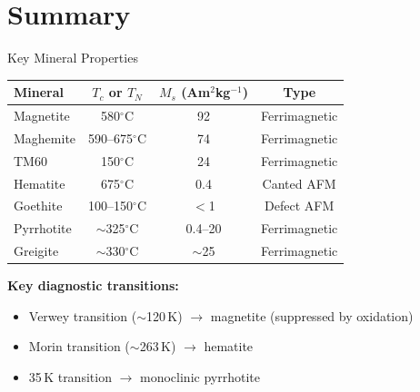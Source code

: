 \documentclass[aspectratio=169,11pt]{beamer}
\begin{document}
\section{Summary}

\begin{frame}{Key Mineral Properties}

\centering
\small
\begin{tabular}{lccc}
  \toprule
  \textbf{Mineral} & \textbf{$T_c$ or $T_N$} & \textbf{$M_s$ (Am$^2$kg$^{-1}$)} & \textbf{Type} \\
  \midrule
  Magnetite       & 580$^{\circ}$C  & 92   & Ferrimagnetic \\
  Maghemite       & 590--675$^{\circ}$C & 74   & Ferrimagnetic \\
  TM60            & 150$^{\circ}$C  & 24   & Ferrimagnetic \\
  Hematite        & 675$^{\circ}$C  & 0.4  & Canted AFM \\
  Goethite        & 100--150$^{\circ}$C & $<$1 & Defect AFM \\
  Pyrrhotite      & $\sim$325$^{\circ}$C & 0.4--20 & Ferrimagnetic \\
  Greigite        & $\sim$330$^{\circ}$C & $\sim$25  & Ferrimagnetic \\
  \bottomrule
\end{tabular}

\vspace{1em}

\textbf{Key diagnostic transitions:}
\begin{itemize}
  \item Verwey transition ($\sim$120\,K) $\rightarrow$ magnetite (suppressed by oxidation)
  \item Morin transition ($\sim$263\,K) $\rightarrow$ hematite
  \item 35\,K transition $\rightarrow$ monoclinic pyrrhotite
\end{itemize}

\end{frame}
\end{document}
